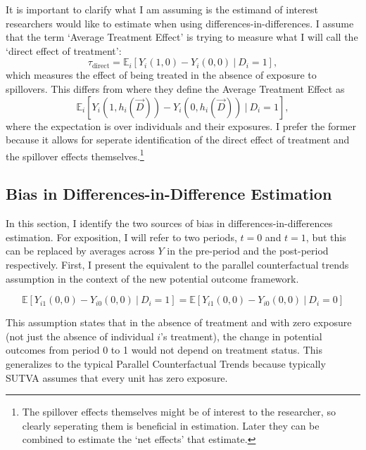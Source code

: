 \documentclass[11pt]{article}
\begin{document}
It is important to clarify what I am assuming is the estimand of interest researchers would like to estimate when using differences-in-differences. I assume that the term `Average Treatment Effect' is trying to measure what I will call the `direct effect of treatment': \[
    \tau_{\text{direct}} = \mathbb{E}_i \left[ Y_{i}(1, 0) - Y_{i}(0, 0) \ \vert \ D_i = 1 \right],
\] 
which measures the effect of being treated in the absence of exposure to spillovers. This differs from \citet{Sävje_Aronow_Hudgens_2019} where they define the Average Treatment Effect as \[ 
    \mathbb{E}_i \left[ Y_{i}(1, h_i(\vec{D})) - Y_{i}(0, h_i(\vec{D})) \ \vert \ D_i = 1 \right],
\] 
where the expectation is over individuals and their exposures. I prefer the former because it allows for seperate identification of the direct effect of treatment and the spillover effects themselves.\footnote{The spillover effects themselves might be of interest to the researcher, so clearly seperating them is beneficial in estimation. Later they can be combined to estimate the `net effects' that \citet{Sävje_Aronow_Hudgens_2019} estimate.}


\subsection{Bias in Differences-in-Difference Estimation}

In this section, I identify the two sources of bias in differences-in-differences estimation. For exposition, I will refer to two periods, $t = 0$ and $t = 1$, but this can be replaced by averages across $Y$ in the pre-period and the post-period respectively. First, I present the equivalent to the parallel counterfactual trends assumption in the context of the new potential outcome framework. 

\begin{assumption}\label{parallel}
    \[ 
        \mathbb{E}\left[ Y_{i1}(0, 0) - Y_{i0}(0, 0) \ \vert \ D_i = 1 \right] = 
        \mathbb{E}\left[ Y_{i1}(0, 0) - Y_{i0}(0, 0) \ \vert \ D_i = 0 \right]
    \]
\end{assumption}

This assumption states that in the absence of treatment and with zero exposure (not just the absence of individual $i$'s treatment), the change in potential outcomes from period 0 to 1 would not depend on treatment status. This generalizes to the typical Parallel Counterfactual Trends because typically SUTVA assumes that every unit has zero exposure.
\end{document}
